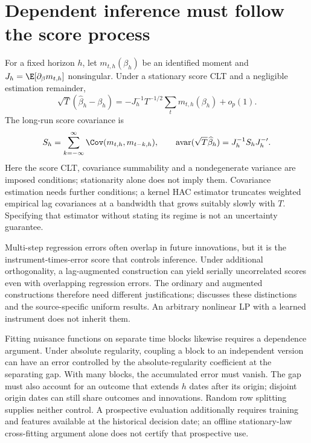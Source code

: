 \section{Dependent inference must follow the score process}
\label{r3:series-inference}
For a fixed horizon $h$, let $m_{t,h}(\beta_h)$ be an identified
moment and $J_h=\E[\partial_\beta m_{t,h}]$ nonsingular.
Under a stationary score CLT and a negligible estimation remainder,
\[
 \sqrt T(\widehat\beta_h-\beta_h)
 =-J_h^{-1}T^{-1/2}\sum_t m_{t,h}(\beta_h)+o_p(1).
\]
The long-run score covariance is
\begin{equation}
 S_h=\sum_{k=-\infty}^{\infty}
             \Cov(m_{t,h},m_{t-k,h}),\qquad
 \operatorname{avar}(\sqrt T\widehat\beta_h)
                  =J_h^{-1}S_hJ_h^{-\prime}.
 \label{r3:hac}
\end{equation}
Here the score CLT, covariance summability and a nondegenerate variance
are imposed conditions; stationarity alone does not imply them.
Covariance estimation needs further conditions;
a kernel HAC estimator truncates weighted empirical lag covariances
at a bandwidth that grows suitably slowly with $T$. Specifying that
estimator without stating its regime is not an uncertainty guarantee.

Multi-step regression errors often overlap in future innovations, but
it is the instrument-times-error score that controls inference. Under
additional orthogonality, a lag-augmented construction can yield
serially uncorrelated scores even with overlapping regression errors.
The ordinary and augmented constructions therefore need different
justifications; \citet[Sections 6.1--6.3]{jorda2024} discusses these
distinctions and the source-specific uniform results. An arbitrary
nonlinear LP with a learned instrument does not inherit them.

Fitting nuisance functions on separate time blocks likewise requires
a dependence argument. Under absolute regularity, coupling a block
to an independent version can have an error controlled by the
absolute-regularity coefficient at the separating gap. With many
blocks, the accumulated error must vanish. The gap must also account
for an outcome that extends $h$ dates after its origin; disjoint
origin dates can still share outcomes and innovations. Random row
splitting supplies neither control. A prospective evaluation additionally
requires training and features available at the historical decision
date; an offline stationary-law cross-fitting argument alone does
not certify that prospective use.

